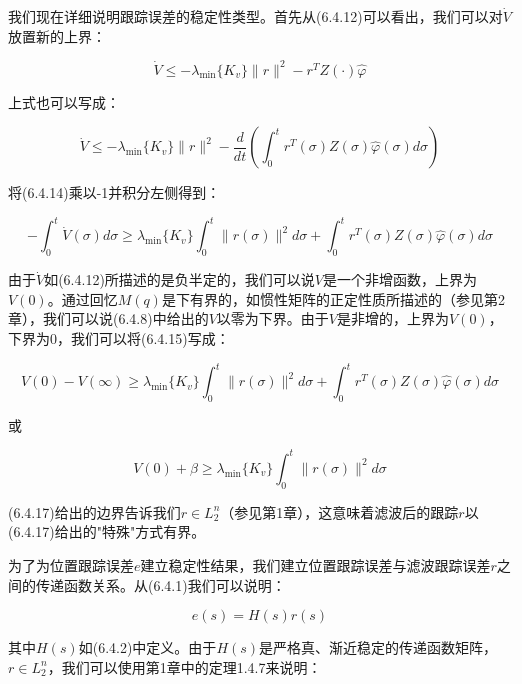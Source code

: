 \documentclass[12pt,a4paper]{ctexart}
\begin{document}
我们现在详细说明跟踪误差的稳定性类型。首先从(6.4.12)可以看出，我们可以对$\dot{V}$放置新的上界：

\begin{equation}
\dot{V} \leq -\lambda_{\min}\{K_v\}\|r\|^2 - r^T Z(\cdot)\hat{\varphi}
\end{equation}

上式也可以写成：

\begin{equation}
\dot{V} \leq -\lambda_{\min}\{K_v\}\|r\|^2 - \frac{d}{dt}\left(\int_0^t r^T(\sigma)Z(\sigma)\hat{\varphi}(\sigma)d\sigma\right)
\end{equation}

将(6.4.14)乘以-1并积分左侧得到：

\begin{equation}
-\int_0^t \dot{V}(\sigma)d\sigma \geq \lambda_{\min}\{K_v\}\int_0^t \|r(\sigma)\|^2 d\sigma + \int_0^t r^T(\sigma)Z(\sigma)\hat{\varphi}(\sigma)d\sigma
\end{equation}

由于$\dot{V}$如(6.4.12)所描述的是负半定的，我们可以说$V$是一个非增函数，上界为$V(0)$。通过回忆$M(q)$是下有界的，如惯性矩阵的正定性质所描述的（参见第2章），我们可以说(6.4.8)中给出的$V$以零为下界。由于$V$是非增的，上界为$V(0)$，下界为$0$，我们可以将(6.4.15)写成：

\begin{equation}
V(0) - V(\infty) \geq \lambda_{\min}\{K_v\}\int_0^t \|r(\sigma)\|^2 d\sigma + \int_0^t r^T(\sigma)Z(\sigma)\hat{\varphi}(\sigma)d\sigma
\end{equation}

或

\begin{equation}
V(0) + \beta \geq \lambda_{\min}\{K_v\}\int_0^t \|r(\sigma)\|^2 d\sigma
\end{equation}

(6.4.17)给出的边界告诉我们$r \in L_2^{n}$（参见第1章），这意味着滤波后的跟踪$r$以(6.4.17)给出的"特殊"方式有界。

为了为位置跟踪误差$e$建立稳定性结果，我们建立位置跟踪误差与滤波跟踪误差$r$之间的传递函数关系。从(6.4.1)我们可以说明：

\begin{equation}\label{eq:transfer-e-r}
e(s) = H(s)r(s)
\end{equation}

其中$H(s)$如(6.4.2)中定义。由于$H(s)$是严格真、渐近稳定的传递函数矩阵，$r \in L_2^{n}$，我们可以使用第1章中的定理1.4.7来说明：
\end{document}
